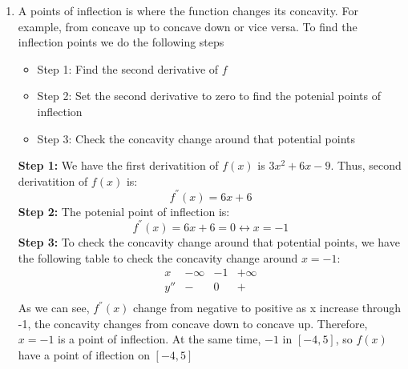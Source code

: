 \documentclass{article}
\begin{document}
\begin{enumerate}[label=({\alph*})]
        \item A points of inflection is where the function changes its concavity. For example, from concave up to concave down or vice versa. To find the inflection points we do the following steps
        \begin{itemize}
            \item Step 1: Find the second derivative of \(f\)
            \item Step 2: Set the second derivative to zero to find the potenial points of inflection
            \item Step 3: Check the concavity change around that potential points
        \end{itemize}
        \textbf{Step 1:} We have the first derivatition of \(f(x)\) is \(3x^{2} + 6x - 9\). Thus, second derivatition of \(f(x)\) is:
        \[f^{''}(x) = 6x + 6\]
        \textbf{Step 2:} The potenial point of inflection is:
        \[f^{''}(x) = 6x + 6 = 0 \leftrightarrow x = -1\]
        \textbf{Step 3:} To check the concavity change around that potential points, we have the following table to check the concavity change around \(x = -1\):
        \[
        \begin{array}{c|c|c|c}
            x & -\infty & -1 & +\infty \\
            \hline
            y'' & - & 0 & + \\
        \end{array}
        \]
        As we can see, \(f^{''}(x)\) change from negative to positive as x increase through -1, the concavity changes from concave down to concave up. Therefore, \(x = -1\) is a point of inflection. At the same time, \(-1\) in \([-4, 5]\), so \(f(x)\) have a point of iflection on \([-4, 5]\)
    \end{enumerate}
    \newpage
\end{document}
